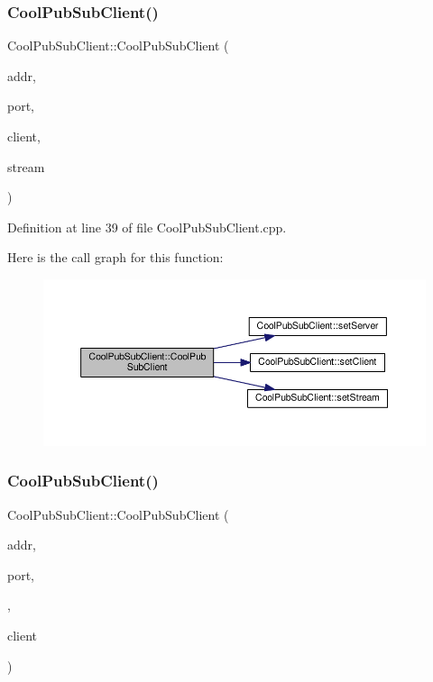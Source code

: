 \subsubsection{\texorpdfstring{Cool\+Pub\+Sub\+Client()}{CoolPubSubClient()}\hspace{0.1cm}{\footnotesize\ttfamily [4/14]}}
{\footnotesize\ttfamily Cool\+Pub\+Sub\+Client\+::\+Cool\+Pub\+Sub\+Client (\begin{DoxyParamCaption}\item[{I\+P\+Address}]{addr,  }\item[{uint16\+\_\+t}]{port,  }\item[{Client \&}]{client,  }\item[{Stream \&}]{stream }\end{DoxyParamCaption})}



Definition at line 39 of file Cool\+Pub\+Sub\+Client.\+cpp.

Here is the call graph for this function\+:
\nopagebreak
\begin{figure}[H]
\begin{center}
\leavevmode
\includegraphics[width=350pt]{class_cool_pub_sub_client_af8b1aeb169366da52e3289bb6c238b6b_cgraph}
\end{center}
\end{figure}
\mbox{\label{class_cool_pub_sub_client_a1743a9eeef19b3b6ff1db5be8df55a9c}} 
\subsubsection{\texorpdfstring{Cool\+Pub\+Sub\+Client()}{CoolPubSubClient()}\hspace{0.1cm}{\footnotesize\ttfamily [5/14]}}
{\footnotesize\ttfamily Cool\+Pub\+Sub\+Client\+::\+Cool\+Pub\+Sub\+Client (\begin{DoxyParamCaption}\item[{I\+P\+Address}]{addr,  }\item[{uint16\+\_\+t}]{port,  }\item[{\hyperlink{class_cool_pub_sub_client_a021ec75e9fbaf658370b8005ccfddc14}{M\+Q\+T\+T\+\_\+\+C\+A\+L\+L\+B\+A\+C\+K\+\_\+\+S\+I\+G\+N\+A\+T\+U\+RE}}]{,  }\item[{Client \&}]{client }\end{DoxyParamCaption})}



